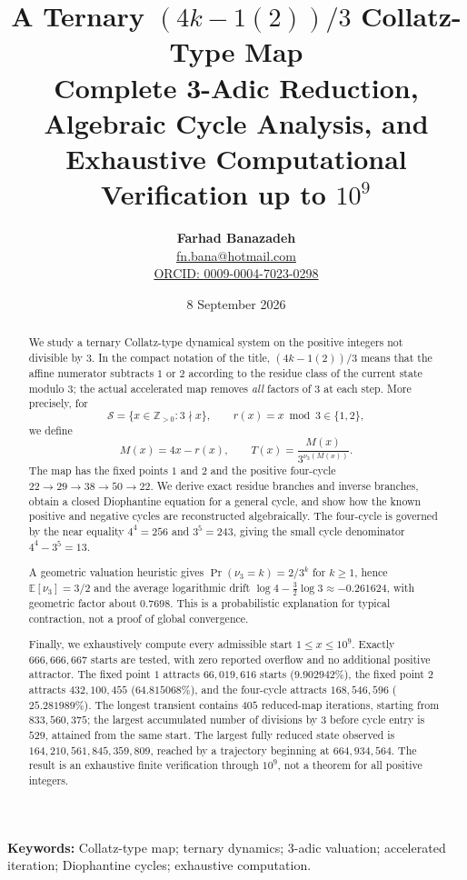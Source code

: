 \documentclass[11pt]{article}
\title{\textbf{A Ternary $(4k-1(2))/3$ Collatz-Type Map}\\[4pt]
\large Complete 3-Adic Reduction, Algebraic Cycle Analysis, and Exhaustive Computational Verification up to $10^9$}
\author{\textbf{Farhad Banazadeh}\\
\href{mailto:fn.bana@hotmail.com}{fn.bana@hotmail.com}\\
\href{https://orcid.org/0009-0004-7023-0298}{ORCID: 0009-0004-7023-0298}}
\date{8 September 2026}
\newcommand{\vthree}{\nu_3}
\newcommand{\Sset}{\mathcal S}
\newcommand{\Tmap}{T}
\newcommand{\Mmap}{M}
\begin{document}
\maketitle

\begin{abstract}
We study a ternary Collatz-type dynamical system on the positive integers not divisible by $3$.  In the compact notation of the title, $(4k-1(2))/3$ means that the affine numerator subtracts $1$ or $2$ according to the residue class of the current state modulo $3$; the actual accelerated map removes \emph{all} factors of $3$ at each step.  More precisely, for
\[
\Sset=\{x\in\mathbb Z_{>0}:3\nmid x\},\qquad r(x)=x\bmod 3\in\{1,2\},
\]
we define
\[
\Mmap(x)=4x-r(x),\qquad
\Tmap(x)=\frac{\Mmap(x)}{3^{\vthree(\Mmap(x))}}.
\]
The map has the fixed points $1$ and $2$ and the positive four-cycle
$22\to29\to38\to50\to22$.  We derive exact residue branches and inverse branches, obtain a closed Diophantine equation for a general cycle, and show how the known positive and negative cycles are reconstructed algebraically.  The four-cycle is governed by the near equality $4^4=256$ and $3^5=243$, giving the small cycle denominator $4^4-3^5=13$.

A geometric valuation heuristic gives
$\Pr(\vthree=k)=2/3^k$ for $k\ge1$, hence
$\mathbb E[\vthree]=3/2$ and the average logarithmic drift
$\log 4-\frac32\log 3\approx-0.261624$, with geometric factor about $0.7698$.  This is a probabilistic explanation for typical contraction, not a proof of global convergence.

Finally, we exhaustively compute every admissible start $1\le x\le10^9$.  Exactly $666,666,667$ starts are tested, with zero reported overflow and no additional positive attractor.  The fixed point $1$ attracts $66,019,616$ starts ($9.902942\%$), the fixed point $2$ attracts $432,100,455$ ($64.815068\%$), and the four-cycle attracts $168,546,596$ ($25.281989\%$).  The longest transient contains $405$ reduced-map iterations, starting from $833,560,375$; the largest accumulated number of divisions by $3$ before cycle entry is $529$, attained from the same start.  The largest fully reduced state observed is $164,210,561,845,359,809$, reached by a trajectory beginning at $664,934,564$.  The result is an exhaustive finite verification through $10^9$, not a theorem for all positive integers.
\end{abstract}

\noindent\textbf{Keywords:} Collatz-type map; ternary dynamics; 3-adic valuation; accelerated iteration; Diophantine cycles; exhaustive computation.
\end{document}
